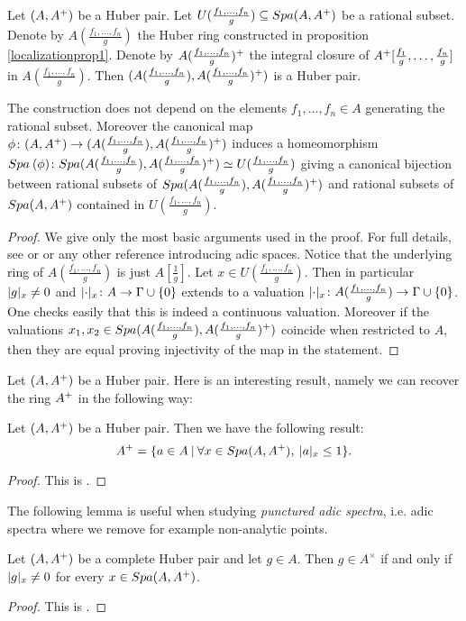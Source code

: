 \begin{prop}\label{localizationprop2}
Let $(A,A{^{+}})$ be a Huber pair. Let $U(\tfrac{f_1,\dots,f_n}{g})\subseteq {Spa({A},{A{^{+}}})}$ be a rational subset.
Denote by $A(\tfrac{f_1,\dots,f_n}{g})$ the Huber ring constructed in proposition \ref{localizationprop1}.
Denote by  $A(\tfrac{f_1,\dots,f_n}{g}){^{+}}$ the integral closure of $A{^{+}}[\tfrac{f_1}{g},\dots,\tfrac{f_n}{g}]$
in $A(\tfrac{f_1,\dots,f_n}{g})$. Then $(A(\tfrac{f_1,\dots,f_n}{g}), A(\tfrac{f_1,\dots,f_n}{g}){^{+}})$ is a Huber pair.

The construction does not depend on the elements $f_1,\dots,f_n\in A$ generating the rational subset.
Moreover the canonical map $\phi\colon(A,A{^{+}})\to(A(\tfrac{f_1,\dots,f_n}{g}), A(\tfrac{f_1,\dots,f_n}{g}){^{+}})$
induces a homeomorphism 
${Spa{\:(\phi)}}\colon{Spa({A(\tfrac{f_1,\dots,f_n}{g})},{A(\tfrac{f_1,\dots,f_n}{g}){^{+}}})}\simeq U(\tfrac{f_1,\dots,f_n}{g})$
giving a canonical bijection between rational subsets of ${Spa({A(\tfrac{f_1,\dots,f_n}{g})},{A(\tfrac{f_1,\dots,f_n}{g}){^{+}}})}$
and rational subsets of ${Spa({A},{A{^{+}}})}$  contained in $U(\tfrac{f_1,\dots,f_n}{g})$.
\end{prop}
\begin{proof}
We give only the most basic arguments used in the proof. For full details, see \cite{Huber94} or \cite{Morel19} or any other reference introducing adic spaces.
Notice that the underlying ring of $A(\tfrac{f_1,\dots,f_n}{g})$ is just $A[\tfrac{1}{g}]$.
Let $x\in U(\tfrac{f_1,\dots,f_n}{g})$. Then in particular $\lvert g\rvert_{x}\neq 0$ and $\lvert\cdot\rvert_{x}\colon A\to\Gamma\cup\{0\}$ extends to a valuation $\lvert\cdot\rvert_{x}\colon A(\tfrac{f_1,\dots,f_n}{g})\to\Gamma\cup\{0\}$.
One checks easily that this is indeed a continuous valuation. 
Moreover if the valuations $x_1, x_2\in {Spa({A(\tfrac{f_1,\dots,f_n}{g})},{A(\tfrac{f_1,\dots,f_n}{g}){^{+}}})}$ coincide when restricted to $A$, then they are equal proving injectivity of the map in the statement.
\end{proof}


Let $(A,A{^{+}})$ be a Huber pair. Here is an interesting result, namely we can recover the ring $A{^{+}}$ in the following way:

\begin{prop}\label{upplusprop}
Let $(A,A{^{+}})$ be a Huber pair. Then we have the following result:
\[A{^{+}} = \{a\in A\:\vert\:\forall x\in{Spa({A},{A{^{+}}})}, \:\lvert a\rvert_{x}\leq 1\}.\]
\end{prop}
\begin{proof}
This is \cite[lemma 3.3]{Huber93}.
\end{proof}
The following lemma is useful when studying \emph{punctured adic spectra}, i.e. adic spectra where we remove for example non-analytic points.
\begin{lemma}\label{lemmaforpuncturedspectra}
Let $(A,A{^{+}})$ be a complete Huber pair and let $g\in A$. Then $g\in A^{\times}$ if and only if $\lvert g\rvert_{x}\neq 0$ for every $x\in{Spa({A},{A{^{+}}})}$.
\end{lemma}
\begin{proof}
This is \cite[corollary III.4.4.4]{Morel19}.
\end{proof}
\clearpage




